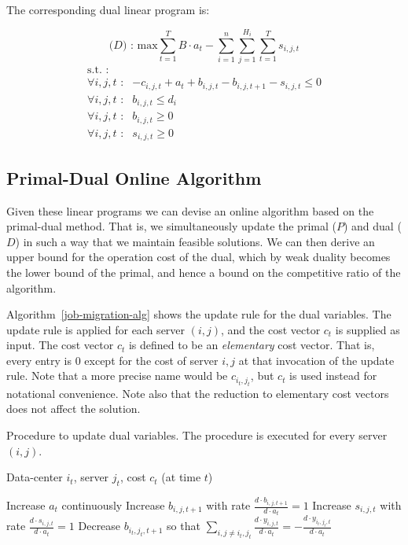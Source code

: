 The corresponding dual linear program is:

\[
\textrm{($D$) : max}   \sum^{T}_{t=1}B \cdot a_t - \sum^{n}_{i=1}\sum^{H_i}_{j=1}\sum^{T}_{t=1}s_{i,j,t}
\]
\[
	\begin{array}{lr}
	\textrm{s.t. :} & \\
		\forall i,j,t \textrm{ :}	    & -c_{i,j,t} + a_t + b_{i,j,t} - b_{i,j,t+1} - s_{i,j,t} \leq 0 \\
		\forall i,j,t \textrm{ :}	    & b_{i,j,t} \leq d_i \\
		\forall i,j,t \textrm{ :}	    & b_{i,j,t} \geq 0 \\
		\forall i,j,t \textrm{ :}	    & s_{i,j,t} \geq 0
	\end{array}
\]

\subsection{Primal-Dual Online Algorithm}
\label{pd-alg}

Given these  linear programs we can devise an online algorithm based on the primal-dual method.
That is, we simultaneously update the primal ($P$) and dual ($D$) in such a way that we maintain feasible solutions.
We can then derive an upper bound for the operation cost of the dual, which by weak duality becomes the lower bound of the primal, and hence a bound on the competitive ratio of the algorithm.

Algorithm~\ref{job-migration-alg} shows the update rule for the dual variables.
The update rule is applied for each server $(i,j)$, and the cost vector $c_{t}$ is supplied as input.
The cost vector $c_t$ is defined to be an \emph{elementary} cost vector. That is, every entry is $0$ except for the cost of server $i,j$ at that invocation of the update rule.
Note that a more precise name would be $c_{i_t,j_t}$, but $c_t$ is used instead for notational convenience.
Note also that the reduction to elementary cost vectors does not affect the solution.

\begin{algorithm}
\caption{Procedure to update dual variables. The procedure is executed for every server $(i,j)$.}
\label{job-migration-alg}
\begin{algorithmic}[1]
\REQUIRE Data-center $i_t$, server $j_t$, cost $c_t$ (at time $t$)

 \STATE Increase $a_t$ continuously 
  \STATE Increase $b_{i,j,t+1}$ with rate $\frac{d \cdot b_{i,j,t+1}}{d \cdot a_t} = 1$
 \ENDFOR
  \STATE Increase $s_{i,j,t}$ with rate $\frac{d \cdot s_{i,j,t}}{d \cdot a_t}=1$
 \ENDFOR
  \STATE Decrease $b_{i_t,j_t,t+1}$ so that $\sum_{i,j \neq i_t,j_t}\frac{d \cdot y_{i,j,t}}{d \cdot a_t} = -\frac{d \cdot y_{i_t,j_t,t}}{d \cdot a_t}$
 \ENDFOR
\ENDWHILE
\end{algorithmic}
\end{algorithm}

